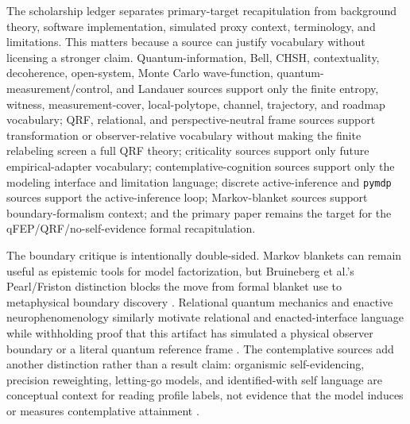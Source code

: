 \documentclass[
]{article}
\begin{document}
The scholarship ledger separates primary-target recapitulation from
background theory, software implementation, simulated proxy context,
terminology, and limitations. This matters because a source can justify
vocabulary without licensing a stronger claim. Quantum-information,
Bell, CHSH, contextuality, decoherence, open-system, Monte Carlo
wave-function, quantum-measurement/control, and Landauer sources support
only the finite entropy, witness, measurement-cover, local-polytope,
channel, trajectory, and roadmap vocabulary; QRF, relational, and
perspective-neutral frame sources support transformation or
observer-relative vocabulary without making the finite relabeling screen
a full QRF theory; criticality sources support only future
empirical-adapter vocabulary; contemplative-cognition sources support
only the modeling interface and limitation language; discrete
active-inference and \texttt{pymdp} sources support the active-inference
loop; Markov-blanket sources support boundary-formalism context; and the
primary paper remains the target for the qFEP/QRF/no-self-evidence
formal recapitulation.

The boundary critique is intentionally double-sided. Markov blankets can
remain useful as epistemic tools for model factorization, but Bruineberg
et al.'s Pearl/Friston distinction blocks the move from formal blanket
use to metaphysical boundary discovery \citep{bruineberg2022emperor}.
Relational quantum mechanics and enactive neurophenomenology similarly
motivate relational and enacted-interface language while withholding
proof that this artifact has simulated a physical observer boundary or a
literal quantum reference frame
\citep{rovelli1996relational, varela1991embodied}. The contemplative
sources add another distinction rather than a result claim: organismic
self-evidencing, precision reweighting, letting-go models, and
identified-with self language are conceptual context for reading profile
labels, not evidence that the model induces or measures contemplative
attainment
\citep{hohwy2026selfevidencingagent, tal2026advancedmeditation, prest2026lettinggo, prest2026selfingwithoutself}.
\end{document}
